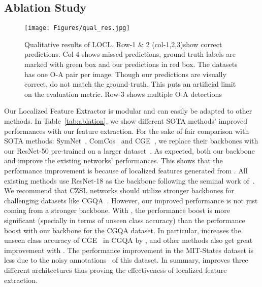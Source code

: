 \documentclass{bmvc2k}
\begin{document}
\vspace{-0.1cm}
\subsection{Ablation Study}
\vspace{-0.1cm}
\begin{figure*}[h]
\begin{center}
\texttt{[image: Figures/qual\_res.jpg]}
\end{center}
\vspace{-0.4cm}
   \caption{Qualitative results of LOCL. Row-1 \& 2 (col-1,2,3)show correct predictions. Col-4 shows missed predictions, ground truth labels are marked with green box and our predictions in red box. The datasets has one O-A pair per image. Though our predictions are visually correct, do not match the ground-truth. This puts an artificial limit on the evaluation metric. Row-3 shows multiple O-A detections}
\vspace{-0.2cm}
\label{fig:Qual-Results1}
\end{figure*}



 Our Localized Feature Extractor  is modular and can easily be adapted to other methods. In Table~\ref{tab:ablation}, we show different SOTA methods' improved performances with our feature extraction. 
For the sake of fair comparison with SOTA methods: SymNet~\cite{li2020symmetry}, ComCos~\cite{mancini2021learning} and CGE~\cite{naeem2021learning}, we replace their backbones with our ResNet-50 pre-trained on a larger dataset~\cite{radford2021learning}. 
As expected, both our backbone and  improve the existing networks' performances. This shows that the performance improvement is because of localized features generated from .
All existing methods use ResNet-18 as the backbone following the seminal work of~\cite{misra2017red}. 
We recommend that CZSL networks should utilize stronger backbones for challenging datasets like CGQA~\cite{naeem2021learning}. 
However, our improved performance is not just coming from a stronger backbone. 
With , the performance boost is more significant (specially in terms of unseen class accuracy) than the performance boost with our backbone for the CGQA dataset. 
In particular,  increases the unseen class accuracy of CGE~\cite{naeem2021learning} in CGQA by , and other methods also get great improvement with . 
The performance improvement in the MIT-States dataset is less due to the noisy annotations~\cite{Atzmon_casual} of this dataset.  
In summary,  improves three different architectures thus proving the effectiveness of localized feature extraction. 
\end{document}
